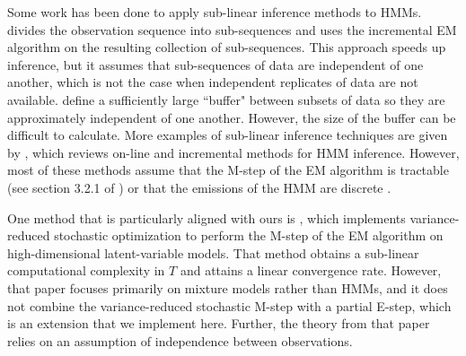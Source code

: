 Some work has been done to apply sub-linear inference methods to HMMs.
\citet{Gotoh:1998} divides the observation sequence into sub-sequences
and uses the incremental EM algorithm on the resulting collection of sub-sequences. This approach speeds up inference, but it assumes that sub-sequences of data are independent of one another, which is not the case when independent replicates of data are not available. \citet{Ye:2017} define a sufficiently large ``buffer" between subsets of data so they are approximately independent of one another. %
However, the size of the buffer can be difficult to calculate. %
More examples of sub-linear inference techniques are given by \citet{Khreich:2012}, which reviews on-line and incremental methods for HMM inference. However, most of these methods assume that the M-step of the EM algorithm is tractable (see section 3.2.1 of \citet{Khreich:2012}) or that the emissions of the HMM are discrete \citep{Baldi:1993}. 

One method that is particularly aligned with ours is \citet{Zhu:2017}, which implements variance-reduced stochastic optimization to perform the M-step of the EM algorithm on high-dimensional latent-variable models. That method obtains a sub-linear computational complexity in $T$ and attains a linear convergence rate. However, that paper focuses primarily on mixture models rather than HMMs, and it does not combine the variance-reduced stochastic M-step with a partial E-step, which is an extension that we implement here. Further, the theory from that paper relies on an assumption of independence between observations.

